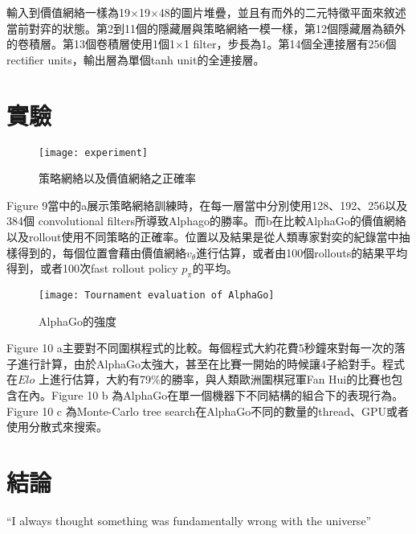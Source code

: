 \documentclass[a4paper,12pt]{article}
\begin{document}
\quad 輸入到價值網絡一樣為19$\times$19$\times$48的圖片堆疊，並且有而外的二元特徵平面來敘述當前對弈的狀態。第2到11個的隱藏層與策略網絡一模一樣，第12個隱藏層為額外的卷積層。第13個卷積層使用1個1$\times$1 filter，步長為1。第14個全連接層有256個 rectifier units，輸出層為單個tanh unit的全連接層。
\section{實驗}
\begin{figure*}[htb]
\texttt{[image: experiment]}
\caption{策略網絡以及價值網絡之正確率}
\end{figure*}
\quad Figure 9當中的a展示策略網絡訓練時，在每一層當中分別使用128、192、256以及384個 convolutional filters所導致Alphago的勝率。而b在比較AlphaGo的價值網絡以及rollout使用不同策略的正確率。位置以及結果是從人類專家對奕的紀錄當中抽樣得到的，每個位置會藉由價值網絡$v_{\theta}$進行估算，或者由100個rollouts的結果平均得到，或者100次fast rollout policy $p_{\pi}$的平均。

\begin{figure*}[htb]
\texttt{[image: Tournament evaluation of AlphaGo]}
\caption{AlphaGo的強度}
\end{figure*}
\quad Figure 10 a主要對不同圍棋程式的比較。每個程式大約花費5秒鐘來對每一次的落子進行計算，由於AlphaGo太強大，甚至在比賽一開始的時候讓4子給對手。程式在$Elo$
上進行估算，大約有79\%的勝率，與人類歐洲圍棋冠軍Fan Hui的比賽也包含在內。Figure 10 b 為AlphaGo在單一個機器下不同結構的組合下的表現行為。Figure 10 c 為Monte-Carlo tree search在AlphaGo不同的數量的thread、GPU或者使用分散式來搜索。
\section{結論}
``I always thought something was fundamentally wrong with the universe'' \citep{adams1995hitchhiker}
\end{document}
